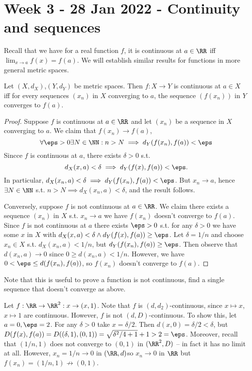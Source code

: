\section{Week 3 - 28 Jan 2022 - Continuity and sequences}
Recall that we have for a real function $f$, it is continuous at $a\in\RR$ iff
$\lim_{x\to a}f(x)=f(a)$. We will establish similar results for functions in
more general metric spaces.
\begin{theorem}
  Let $(X,d_X)$,$(Y,d_Y)$ be metric spaces. Then $f:X\to Y$ is continuous at
  $a\in X$ iff for every sequences $(x_n)$ in $X$ converging to $a$, the
  sequence $(f(x_n))$ in $Y$ converges to $f(a)$.
  \label{<+label+>}
\end{theorem}
\begin{proof}
  Suppose $f$ is continuous at $a\in\RR$ and let $(x_n)$ be a sequence in $X$
  converging to $a$. We claim that $f(x_n)\to f(a)$,
  \[\forall \eps>0 \exists N\in\NN : n>N\implies d_Y(f(x_n),f(a))<\eps\]
  Sincce $f$ is continuous at $a$, there exists $\delta>0$ s.t. 
  \[d_X(x,a)<\delta\implies d_Y(f(x),f(a))<\eps.\]
  In particular, $d_X(x_n,a)<\delta \implies d_Y(f(x_n),f(a))<\eps$. But $x_n\to
  a$, hence $\exists N\in\NN$ s.t. $n>N \implies d_X(x_n,a)<\delta$, and the
  result follows.

  Conversely, suppose $f$ is not continuous at $a\in\RR$. We claim there exists
  a sequence $(x_n)$ in $X$ s.t. $x_n\to a$ we have $f(x_n)$ doesn't converge to
  $f(a)$. Since $f$ is not continuous at $a$ there exists $\eps>0$ s.t. for any
  $\delta>0$ we have some $x$ in $X$ with $d_X(x,a)<\delta \land
  d_Y(f(x),f(a))\geq \eps$. Let $\delta=1/n$ and choose $x_n\in X$ s.t.
  $d_X(x_n,a)<1/n$, but $d_Y(f(x_n),f(a))\geq \eps$. Then observe that
  $d(x_n,a)\to 0$ since $0\geq d(x_n,a)<1/n$. However, we have $0<\eps\leq
  d(f(x_n),f(a))$, so $f(x_n)$ doesn't converge to $f(a)$.
\end{proof}
\begin{remark}
  Note that this is useful to prove a function is not continuous, find a single
  sequence that doesn't converge as above.
  \label{<+label+>}
\end{remark}
\begin{example}
  Let $f:\RR\to\RR^2:x\to (x,1)$. Note that $f$ is $(d,d_2)$-continuous, since
  $x\mapsto x$, $x\mapsto 1$ are continuous. However, $f$ is not
  $(d,D)$-continuous. To show this, let $a=0, \eps=2$. For any $\delta>0$ take
  $x=\delta/2$. Then $d(x,0)=\delta/2 < \delta$, but $D(f(x),f(a))=D(
  (\delta,1),(0,1))= \sqrt{\delta^2/4 + 1} +1 > 2 =\eps$. Moreover, recall that
  $(1/n,1)$ does not converge to $(0,1)$ in $(\RR^2, D)$ -- in fact it has no
  limit at all. However, $x_n=1/n\to 0 $ in $(\RR,d)$so $x_n\to 0$ in $\RR$ but
  $f(x_n)= (1/n,1)\not\to (0,1)$.
\end{example}
